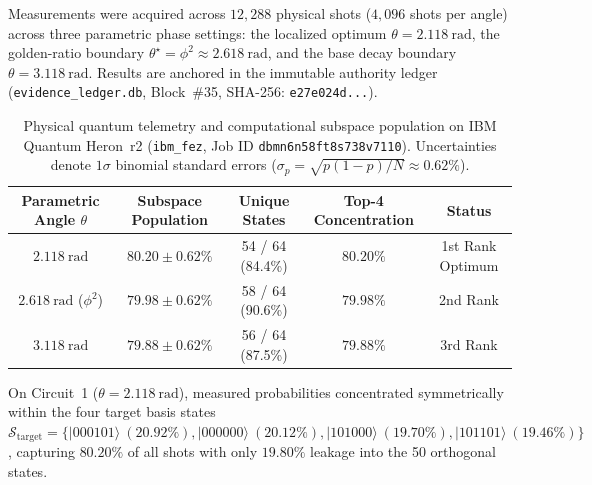 \documentclass[aps,preprint,superscriptaddress,longbibliography]{revtex4-2}
\begin{document}
Measurements were acquired across $12{,}288$ physical shots ($4{,}096$ shots per angle) across three parametric phase settings: the localized optimum $\theta = \SI{2.118}{\radian}$, the golden-ratio boundary $\theta^\star = \phi^2 \approx \SI{2.618}{\radian}$, and the base decay boundary $\theta = \SI{3.118}{\radian}$. Results are anchored in the immutable authority ledger (\texttt{evidence\_ledger.db}, Block~\#35, SHA-256: \texttt{e27e024d...}).

\begin{table}[H]
\centering
\caption{Physical quantum telemetry and computational subspace population on IBM Quantum Heron~r2 (\texttt{ibm\_fez}, Job ID \texttt{dbmn6n58ft8s738v7110}). Uncertainties denote $1\sigma$ binomial standard errors ($\sigma_p = \sqrt{p(1-p)/N} \approx 0.62\%$).}
\label{tab:heron_telemetry}
\begin{tabular}{ccccc}
\toprule
Parametric Angle $\theta$ & Subspace Population & Unique States & Top-4 Concentration & Status \\
\midrule
$\SI{2.118}{\radian}$ & $\mathbf{80.20 \pm 0.62\%}$ & 54 / 64 (84.4\%) & $\mathbf{80.20\%}$ & 1st Rank Optimum \\
$\SI{2.618}{\radian}$ ($\phi^2$) & $79.98 \pm 0.62\%$ & 58 / 64 (90.6\%) & $79.98\%$ & 2nd Rank \\
$\SI{3.118}{\radian}$ & $79.88 \pm 0.62\%$ & 56 / 64 (87.5\%) & $79.88\%$ & 3rd Rank \\
\bottomrule
\end{tabular}
\end{table}

On Circuit~1 ($\theta = \SI{2.118}{\radian}$), measured probabilities concentrated symmetrically within the four target basis states $\mathcal{S}_{\mathrm{target}} = \{|000101\rangle\ (20.92\%), |000000\rangle\ (20.12\%), |101000\rangle\ (19.70\%), |101101\rangle\ (19.46\%)\}$, capturing $80.20\%$ of all shots with only $19.80\%$ leakage into the 50 orthogonal states. 
\end{document}
